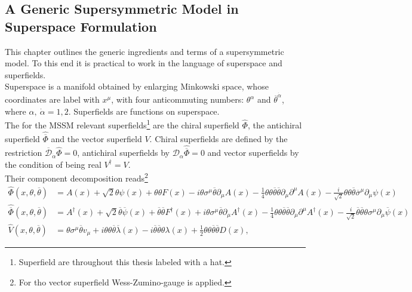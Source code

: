 \subsection{A Generic Supersymmetric Model in Superspace Formulation}
This chapter outlines the generic ingredients and terms of a supersymmetric model. To this end it is practical to work in the language of superspace and superfields.\\
Superspace is a manifold obtained by enlarging Minkowski space, whose coordinates are label with $x^\mu$, with four anticommuting numbers: $\theta^\alpha$ and $\overline{\theta}^{\dot{\alpha}}$, where $\alpha,\ \dot{\alpha} = 1,2$. Superfields are functions on superspace.\\
The for the MSSM relevant superfields\footnote{Superfield are throughout this thesis labeled with a hat.} are the chiral superfield $\hat{\Phi}$, the antichiral superfield $\hat{\overline{\Phi}}$ and the vector superfield $V$. Chiral superfields are defined by the restriction $\overline{\mathcal{D}}_{\dot{\alpha}}\hat{\Phi} = 0$, antichiral superfields by $\mathcal{D}_\alpha\hat{\overline{\Phi}} = 0$ and vector superfields by the condition of being real $V^\dagger = V$.\\
Their component decomposition reads\footnote{For tho vector superfield Wess-Zumino-gauge is applied.}
\begin{align}
\hat{\Phi}(x,\theta,\overline{\theta}) &= A(x) + \sqrt{2}\theta\psi(x) + \theta\theta F(x) - i\theta\sigma^\mu \overline{\theta}\partial_\mu A(x) - \frac{1}{4}\theta\theta\overline{\theta}\overline{\theta}\partial_\mu\partial^\mu A(x) - \frac{i}{\sqrt{2}}\theta\theta\overline{\theta}\overline{\sigma}^\mu \partial_\mu\psi(x)\nonumber\\
\hat{\overline{\Phi}}(x,\theta,\overline{\theta}) &= A^\dagger(x) + \sqrt{2}\overline{\theta}\overline{\psi}(x) + \overline{\theta}\overline{\theta} F^\dagger(x) + i\theta\sigma^\mu \overline{\theta}\partial_\mu A^\dagger(x) - \frac{1}{4}\theta\theta\overline{\theta}\overline{\theta}\partial_\mu\partial^\mu A^\dagger(x) - \frac{i}{\sqrt{2}}\overline{\theta}\overline{\theta}\theta\sigma^\mu \partial_\mu\overline{\psi}(x)\nonumber\\
\hat{V}(x,\theta,\overline{\theta}) &= \theta\sigma^\mu\overline{\theta} v_\mu + i\theta\theta\overline{\theta}\overline{\lambda}(x) -i \overline{\theta}\overline{\theta}\theta\lambda(x) + \frac{1}{2}\theta\theta\overline{\theta}\overline{\theta}D(x),\label{eq:superfielddecomp}
\end{align}
